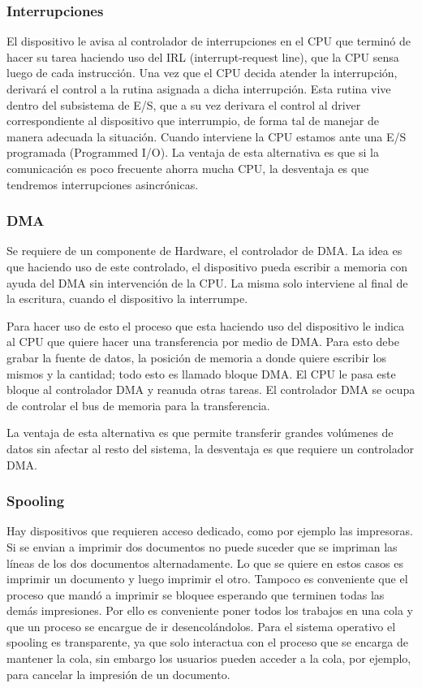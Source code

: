 \documentclass{article}
\begin{document}
\subsubsection{Interrupciones}

El dispositivo le avisa al controlador de interrupciones en el CPU que termin\'o de hacer su tarea haciendo uso del IRL (interrupt-request line), que la CPU sensa luego de cada instrucción. Una vez que el CPU decida atender la interrupci\'on, derivará el control a la rutina asignada a dicha interrupción. Esta rutina vive dentro del subsistema de E/S, que a su vez derivara el control al driver correspondiente al dispositivo que interrumpio, de forma tal de manejar de manera adecuada la situación. Cuando interviene la CPU estamos ante una E/S programada (Programmed I/O). La ventaja de esta alternativa es que si la comunicación es poco frecuente ahorra mucha CPU, la desventaja es que tendremos interrupciones asincrónicas.

\subsubsection{DMA}

Se requiere de un componente de Hardware, el controlador de DMA. La idea es que haciendo uso de este controlado, el dispositivo pueda escribir a memoria con ayuda del DMA sin intervención de la CPU. La misma solo interviene al final de la escritura, cuando el dispositivo la interrumpe.

Para hacer uso de esto el proceso que esta haciendo uso del dispositivo le indica al CPU que quiere hacer una transferencia por medio de DMA. Para esto debe grabar la fuente de datos, la posición de memoria a donde quiere escribir los mismos y la cantidad; todo esto es llamado bloque DMA. El CPU le pasa este bloque al controlador DMA y reanuda otras tareas. El controlador DMA se ocupa de controlar el bus de memoria para la transferencia.

La ventaja de esta alternativa es que permite transferir grandes volúmenes de datos sin afectar al resto del sistema, la desventaja es que requiere un controlador DMA.

\subsubsection{Spooling}

Hay dispositivos que requieren acceso dedicado, como por ejemplo las impresoras. Si se envian a imprimir dos documentos no puede suceder que se impriman las l\'ineas de los dos documentos alternadamente. Lo que se quiere en estos casos es imprimir un documento y luego imprimir el otro. Tampoco es conveniente que el proceso que mand\'o a imprimir se bloquee esperando que terminen todas las dem\'as impresiones. Por ello es conveniente poner todos los trabajos en una cola y que un proceso se encargue de ir desencol\'andolos. Para el sistema operativo el spooling es transparente, ya que solo interactua con el proceso que se encarga de mantener la cola, sin embargo los usuarios pueden acceder a la cola, por ejemplo, para cancelar la impresi\'on de un documento.
\end{document}

